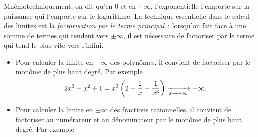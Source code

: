 \documentclass{magnolia}
\begin{document}
\begin{remarques}
\remarque Mnémotechniquement, on dit qu'en 0 et en $+\infty$, l'exponentielle
  l'emporte sur la puissance qui l'emporte sur le logarithme.
\remarque La technique essentielle dans le calcul des limites est la
  \emph{factorisation par le terme principal}~: lorsqu'on fait face à une somme de termes
  qui tendent vers $\pm\infty$, il est nécessaire de factoriser par le terme qui tend
  \og le plus vite vers l'infini\fg. 
\begin{itemize}
\item Pour calculer la limite en $\pm\infty$ des polynômes, il convient de
  factoriser par le monôme de plus haut degré. Par exemple
  $$2x^3-x^2+1=x^3\left(2-\frac{1}{x}+\frac{1}{x^3}\right)\xrightarrow[x\rightarrow -\infty]{}-\infty.$$
\item Pour calculer la limite en $\pm\infty$ des fractions rationnelles, il
  convient de factoriser au numérateur et au dénominateur par le monôme de
  plus haut degré. Par exemple
  

\end{itemize}
\end{remarques}
\end{document}
